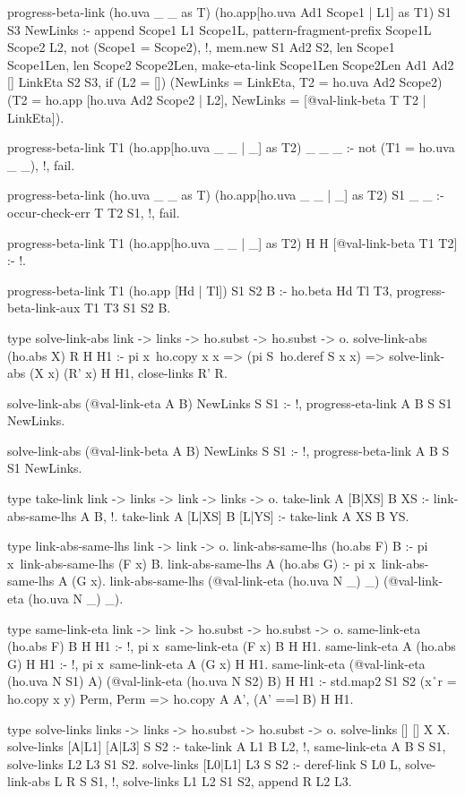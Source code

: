 \begin{elpicode}
  progress-beta-link (ho.uva _ _ as T) (ho.app[ho.uva Ad1 Scope1 | L1] as T1) S1 S3 NewLinks :-
    append Scope1 L1 Scope1L,
    pattern-fragment-prefix Scope1L Scope2 L2,
    not (Scope1 = Scope2), !,
    mem.new S1 Ad2 S2,
    len Scope1 Scope1Len,
    len Scope2 Scope2Len,
    make-eta-link Scope1Len Scope2Len Ad1 Ad2 [] LinkEta S2 S3,
    if (L2 = []) (NewLinks = LinkEta, T2 = ho.uva Ad2 Scope2) 
      (T2 = ho.app [ho.uva Ad2 Scope2 | L2], 
      NewLinks = [@val-link-beta T T2 | LinkEta]).

  progress-beta-link T1 (ho.app[ho.uva _ _ | _] as T2) _ _ _ :- 
    not (T1 = ho.uva _ _), !, fail.

  progress-beta-link (ho.uva _ _ as T) (ho.app[ho.uva _ _ | _] as T2) S1 _ _ :- 
    occur-check-err T T2 S1, !, fail.

  progress-beta-link T1 (ho.app[ho.uva _ _ | _] as T2) H H [@val-link-beta T1 T2] :- !.

  progress-beta-link T1 (ho.app [Hd | Tl]) S1 S2 B :-
    ho.beta Hd Tl T3, 
    progress-beta-link-aux T1 T3 S1 S2 B.

  type solve-link-abs link -> links -> ho.subst -> ho.subst -> o.
  solve-link-abs (ho.abs X) R H H1 :- 
    pi x\ ho.copy x x => (pi S\ ho.deref S x x) => 
      solve-link-abs (X x) (R' x) H H1,
    close-links R' R.

  solve-link-abs (@val-link-eta A B) NewLinks S S1 :- !,
    progress-eta-link A B S S1 NewLinks.

  solve-link-abs (@val-link-beta A B) NewLinks S S1 :- !,
    progress-beta-link A B S S1 NewLinks.

  type take-link link -> links -> link -> links -> o.
  take-link A [B|XS] B XS :- link-abs-same-lhs A B, !.
  take-link A [L|XS] B [L|YS] :- take-link A XS B YS.

  type link-abs-same-lhs link -> link -> o.
  link-abs-same-lhs (ho.abs F) B :- 
    pi x\ link-abs-same-lhs (F x) B.
  link-abs-same-lhs A (ho.abs G) :- 
    pi x\ link-abs-same-lhs A (G x).
  link-abs-same-lhs (@val-link-eta (ho.uva N _) _) (@val-link-eta (ho.uva N _) _).

  type same-link-eta link -> link -> ho.subst -> ho.subst -> o.
  same-link-eta (ho.abs F) B H H1 :- !, pi x\ same-link-eta (F x) B H H1.
  same-link-eta A (ho.abs G) H H1 :- !, pi x\ same-link-eta A (G x) H H1.
  same-link-eta (@val-link-eta (ho.uva N S1) A)
                (@val-link-eta (ho.uva N S2) B) H H1 :-
    std.map2 S1 S2 (x\y\r\ r = ho.copy x y) Perm,
    Perm => ho.copy A A',
    (A' ==l B) H H1.

  type solve-links links -> links -> ho.subst -> ho.subst -> o.
  solve-links [] [] X X.
  solve-links [A|L1] [A|L3] S S2 :- take-link A L1 B L2, !,
    same-link-eta A B S S1, 
    solve-links L2 L3 S1 S2.
  solve-links [L0|L1] L3 S S2 :- deref-link S L0 L,
    solve-link-abs L R S S1, !,
    solve-links L1 L2 S1 S2, append R L2 L3.
\end{elpicode}

